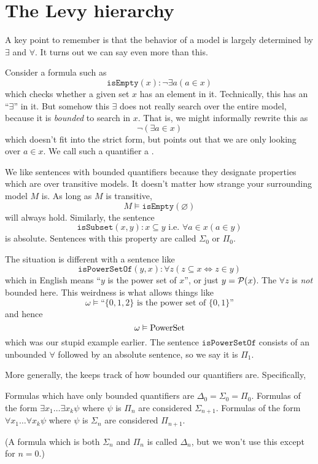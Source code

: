 \section{The Levy hierarchy}
A key point to remember is that the behavior of a model is largely determined by $\exists$ and $\forall$.
It turns out we can say even more than this.

Consider a formula such as
\[ \mathtt{isEmpty}(x) : \neg \exists a (a \in x) \]
which checks whether a given set $x$ has an element in it.
Technically, this has an ``$\exists$'' in it.
But somehow this $\exists$ does not really search over the entire model,
because it is \emph{bounded} to search in $x$.
That is, we might informally rewrite this as
\[ \neg (\exists a \in x) \]
which doesn't fit into the strict form,
but points out that we are only looking over $a \in x$.
We call such a quantifier a .

We like sentences with bounded quantifiers because they designate
properties which are  over transitive models.
It doesn't matter how strange your surrounding model $M$ is.
As long as $M$ is transitive, 
\[ M \vDash \mathtt{isEmpty}(\varnothing) \]
will always hold.
Similarly, the sentence
\[ \mathtt{isSubset}(x,y) : x \subseteq y \text { i.e. } \forall a \in x (a \in y) \]
is absolute.
Sentences with this property are called $\Sigma_0$ or $\Pi_0$.

The situation is different with a sentence like
\[
	\mathtt{isPowerSetOf}(y,x) :
	\forall z \left( z \subseteq x \iff z \in y  \right)
\]
which in English means ``$y$ is the power set of $x$'', or just $y = \mathcal P(x)$.
The $\forall z$ is \emph{not} bounded here.
This weirdness is what allows things like
\[ \omega \vDash \text{``$\{0,1,2\}$ is the power set of $\{0,1\}$''} \]
and hence
\[ \omega \vDash \mathrm{PowerSet} \]
which was our stupid example earlier.
The sentence $\mathtt{isPowerSetOf}$ consists of an unbounded $\forall$ followed
by an absolute sentence, so we say it is $\Pi_1$.

More generally, the  keeps track of how bounded our
quantifiers are.
Specifically,
\begin{itemize}
	\ii Formulas which have only bounded quantifiers
	are $\Delta_0 = \Sigma_0 = \Pi_0$.
	\ii Formulas of the form $\exists x_1 \dots \exists x_k \psi$
	where $\psi$ is $\Pi_n$ are considered $\Sigma_{n+1}$.
	\ii Formulas of the form $\forall x_1 \dots \forall x_k \psi$
	where $\psi$ is $\Sigma_n$ are considered $\Pi_{n+1}$.
\end{itemize}
(A formula which is both $\Sigma_n$ and $\Pi_n$ is called $\Delta_n$, but we won't
use this except for $n=0$.)


